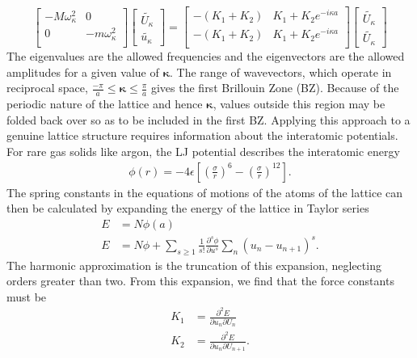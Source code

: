 \begin{equation}
\begin{bmatrix}
  -M\omega_\kappa^2 & 0\\
  0 & -m\omega_\kappa^2\\ 
 \end{bmatrix}
\begin{bmatrix}
\tilde{U_\kappa} \\ 
\tilde{u_\kappa}
\end{bmatrix}
=
\begin{bmatrix}
  -(K_1+K_2) & K_1+K_2e^{-i\kappa a}\\
  -(K_1+K_2) & K_1+K_2e^{-i\kappa a}\\ 
 \end{bmatrix}
\begin{bmatrix}
\tilde{U_\kappa} \\ \tilde{U_\kappa}
\end{bmatrix}
\end{equation}
%
The eigenvalues are the allowed frequencies and the eigenvectors are the allowed amplitudes for a given value of $\pmb{\kappa}$. The range of wavevectors, which operate in reciprocal space,  $\frac{-\pi}{a}\leq \pmb{\kappa}\leq\frac{\pi}{a}$ gives the first Brillouin Zone (BZ). Because of the periodic nature of the lattice and hence $\pmb{\kappa}$, values outside this region may be folded back over so as to be included in the first BZ.
Applying this approach to a genuine lattice structure requires information about the interatomic potentials. For rare gas solids like argon, the LJ potential describes the interatomic energy
\begin{align}
	\phi(r)=-4\epsilon[(\frac{\sigma}{r})^6-(\frac{\sigma}{r})^{12}].
\end{align}
The spring constants in the equations of motions of the atoms of the lattice can then be calculated by expanding the energy of the lattice in Taylor series
%
\begin{equation}\label{EQ:eng_exp}
\begin{split}
	E&=N\phi(a)\\
	E&=N\phi+\sum_{s\geq1}\frac{1}{s!}\frac{\partial^s\phi}{\partial u^s}\sum_n(u_n-u_{n+1})^s.
\end{split}
\end{equation}
%
The harmonic approximation is the truncation of this expansion, neglecting orders greater than two. From this expansion, we find that the force constants must be
%
\begin{equation}
\begin{split}
	K_1&=\frac{\partial^2 E}{\partial u_n\partial U_{n}}\\
	K_2&=\frac{\partial^2 E}{\partial u_n\partial U_{n+1}}.
\end{split}
\end{equation}
